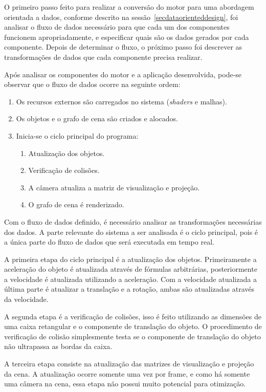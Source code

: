 O primeiro passo feito para realizar a conversão do motor para uma abordagem 
orientada a dados, conforme descrito na sessão~\ref{secdataorienteddesign}, 
foi analisar o fluxo de dados necessário para que cada um dos componentes 
funcionem apropriadamente, e especificar quais são os dados gerados 
por cada componente. Depois de determinar o fluxo, o próximo passo foi 
descrever as transformações de dados que cada componente precisa 
realizar.

Após analisar os componentes do motor e a aplicação desenvolvida, 
pode-se observar que o fluxo de dados ocorre na seguinte ordem:
\begin{enumerate}
    \item Os recursos externos são carregados no sistema (\textit{shaders} e malhas).
    \item Os objetos e o grafo de cena são criados e alocados.
    \item Inicia-se o ciclo principal do programa:
        \begin{enumerate}
           \item Atualização dos objetos.
           \item Verificação de colisões.
           \item A câmera atualiza a matriz de visualização e projeção.
           \item O grafo de cena é renderizado.
        \end{enumerate}
\end{enumerate}

Com o fluxo de dados definido, é necessário analisar as 
transformações necessárias dos dados. A parte relevante do 
sistema a ser analisada é o ciclo principal, pois é a única parte 
do fluxo de dados que será executada em tempo real.

A primeira etapa do ciclo principal é a atualização dos objetos. 
Primeiramente a aceleração do objeto é atualizada através de 
fórmulas arbitrárias, posteriormente a velocidade é atualizada 
utilizando a aceleração. Com a velocidade atualizada a última 
parte é atualizar a translação e a rotação, ambas são atualizadas 
através da velocidade.

A segunda etapa é a verificação de colisões, isso é feito 
utilizando as dimensões de uma caixa retangular e o componente 
de translação do objeto. O procedimento de verificação de colisão 
simplesmente testa se o componente de translação do objeto não 
ultrapassa as bordas da caixa.

A terceira etapa consiste na atualização das matrizes de 
visualização e projeção da cena. A atualização ocorre somente uma 
vez por frame, e como há somente uma câmera na cena, essa etapa 
não possui muito potencial para otimização.

